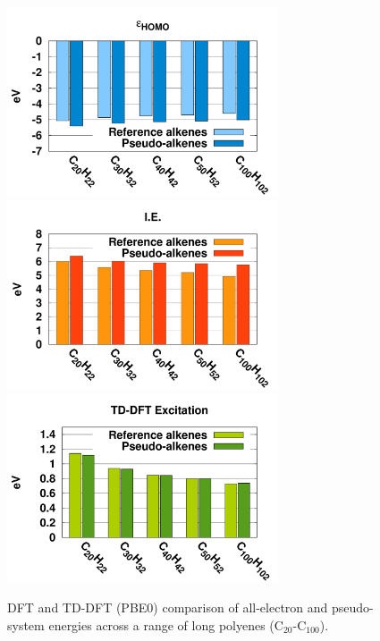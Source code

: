 \documentclass[12pt]{article}
\begin{document}
\begin{figure}
\begin{center}
\includegraphics[width=8cm]{long_pbe0_homo}
\includegraphics[width=8cm]{long_pbe0_ie}
\includegraphics[width=8cm]{long_pbe0_tddft}
\end{center}
\vspace{0.25in}
\hspace*{3in}

\caption{DFT and TD-DFT (PBE0) comparison of all-electron and pseudo-system energies across a range of long polyenes (C\(_{20}\)-C\(_{100}\)).}
\label{fig:long_chain_graphs}
\end{figure}
\end{document}
